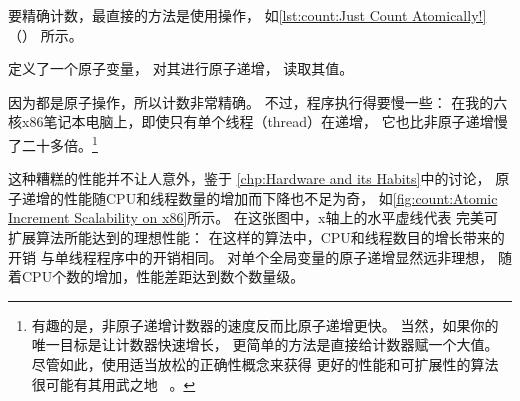 要精确计数，最直接的方法是使用操作，
如\cref{lst:count:Just Count Atomically!}（）
所示。
\begin{fcvref}
定义了一个原子变量，
对其进行原子递增，
读取其值。
\end{fcvref}
因为都是原子操作，所以计数非常精确。
不过，程序执行得要慢一些：
在我的六核x86笔记本电脑上，即使只有单个线程（thread）在递增，
它也比非原子递增慢了二十多倍。\footnote{
	有趣的是，非原子递增计数器的速度反而比原子递增更快。
	当然，如果你的唯一目标是让计数器快速增长，
	更简单的方法是直接给计数器赋一个大值。
	尽管如此，使用适当放松的正确性概念来获得
	更好的性能和可扩展性的算法很可能有其用武之地
	~\cite{Andrews91textbook,Arcangeli03,10.5555/3241639.3241645,DavidUngar2011unsync}。}

这种糟糕的性能并不让人意外，鉴于
\cref{chp:Hardware and its Habits}中的讨论，
原子递增的性能随CPU和线程数量的增加而下降也不足为奇，
如\cref{fig:count:Atomic Increment Scalability on x86}所示。
在这张图中，x轴上的水平虚线代表
完美可扩展算法所能达到的理想性能：
在这样的算法中，CPU和线程数目的增长带来的开销
与单线程程序中的开销相同。
对单个全局变量的原子递增显然远非理想，
随着CPU个数的增加，性能差距达到数个数量级。


